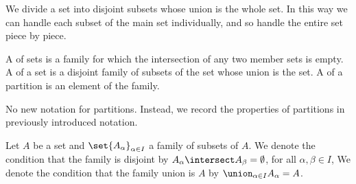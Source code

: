 
\sbasic



\sstart



We divide a set into
disjoint subsets whose
union is the whole set.
In this way we can handle
each subset of the main set
individually, and so handle
the entire set piece by piece.


A 
of sets is a family for which
the intersection of any two
member sets is empty.
A  of
a set is a disjoint family of
subsets of the set
whose union is the set.
A
of a partition is an
element of the family.


No new notation for partitions.
Instead,
we record the properties
of partitions in previously
introduced notation.

Let $A$ be a set and
$\set{A_{\alpha}}_{\alpha \in I}$
a family of subsets of $A$.
We denote the condition that
the family is disjoint by
$A_{\alpha} \intersect A_{\beta} = \emptyset$,
for all $\alpha,\beta \in I$,
We denote the condition that the family
union is $A$ by
$\union_{\alpha \in I} A_{\alpha} = A$.

\strats
